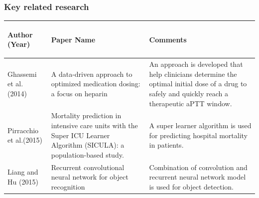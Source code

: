 \documentclass{beamer}
\begin{document}
\begin{frame}\frametitle{Key related research}

\begin{tabular}{ | p{1.5cm} | p{3.8cm} | p{5cm}| } 

\hline 
{\bf \begin{center} \footnotesize{Author (Year)} \end{center}} & {\bf \begin{center} \footnotesize{Paper Name} \end{center}} & {\bf \begin{center} \footnotesize{Comments} \end{center}} \\
\hline
\footnotesize{Ghassemi et al. (2014)} & \footnotesize{A data-driven approach to optimized medication dosing: a focus on heparin} & \footnotesize{An approach is developed that help clinicians determine the optimal initial dose of a drug to safely and quickly reach a therapeutic aPTT window.} \\ 
\hline
\footnotesize{Pirracchio et al.(2015)} & \footnotesize{Mortality prediction in intensive care units with the Super ICU Learner Algorithm (SICULA): a population-based study.} & \footnotesize{A super learner algorithm is used for predicting hospital mortality in patients.}\\
\hline
\footnotesize{Liang  and Hu (2015)} & \footnotesize{Recurrent convolutional neural network for object recognition} & \footnotesize{Combination of convolution and recurrent neural network model is used for object detection.}\\
\hline
\end{tabular}

\end{frame}
\end{document}
